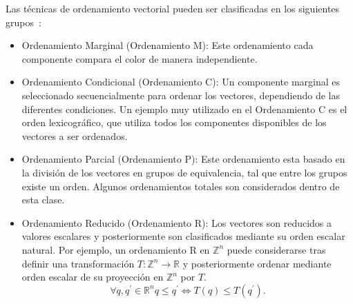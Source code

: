 Las técnicas de ordenamiento vectorial pueden ser clasificadas en los siguientes grupos~\cite{barnett1976ordering}:
\begin{itemize}
\item Ordenamiento Marginal (Ordenamiento M): Este ordenamiento cada componente compara el color de manera independiente.
\item Ordenamiento Condicional (Ordenamiento C): Un componente marginal es seleccionado secuencialmente para ordenar los vectores, dependiendo de las diferentes condiciones. Un ejemplo muy utilizado en el Ordenamiento C es el orden lexicográfico, que utiliza todos los componentes disponibles de los vectores a ser ordenados.
\item Ordenamiento Parcial (Ordenamiento P): Este ordenamiento esta basado en la división de los vectores en grupos de equivalencia, tal que entre los grupos existe un orden. Algunos ordenamientos totales son considerados dentro de esta clase.
\item Ordenamiento Reducido (Ordenamiento R): Los vectores son reducidos a valores escalares y posteriormente son clasificados mediante su orden escalar natural. Por ejemplo, un ordenamiento R en $\mathbb{Z}^{n}$ puede considerarse tras definir una transformación $T : \mathbb{Z}^{n} \rightarrow \mathbb{R}$ y posteriormente ordenar mediante orden escalar de su proyección en $\mathbb{Z}^{n}$ por $T$.
\begin{equation}
\forall q,q^{\prime}\in\mathbb{R}^{n} 
q \leq q^{\prime} \Leftrightarrow T\left(q\right) \leq T\left(q^{\prime}\right).
\end{equation}
\end{itemize}